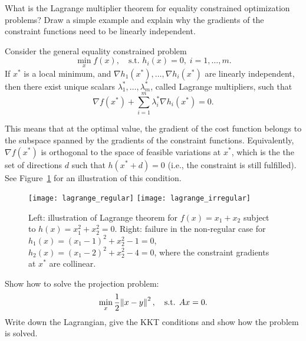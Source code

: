 \documentclass{article}
\begin{document}
\begin{question}
  What is the Lagrange multiplier theorem for equality constrained optimization problems? Draw a
  simple example and explain why the gradients of the constraint functions need to be linearly
  independent.
\end{question}

Consider the general equality constrained problem
\begin{equation*}
  \min_x f(x), \quad\text{s.t. } h_i(x) = 0, \; i = 1, \dots, m.
\end{equation*}
If \(x^*\) is a local minimum, and \(\nabla h_1(x^*), \dots, \nabla h_i(x^*)\) are linearly
independent, then there exist unique scalars \(\lambda^*_1, \dots, \lambda^*_m\), called Lagrange
multipliers, such that
\begin{equation*}
  \nabla f(x^*) + \sum_{i=1}^m \lambda^*_i \nabla h_i(x^*) = 0.
\end{equation*}

This means that at the optimal value, the gradient of the cost function belongs to the subspace
spanned by the gradients of the constraint functions.  Equivalently, \(\nabla f(x^*)\) is orthogonal
to the space of feasible variations at \(x^*\), which is the the set of directions \(d\) such that
\(h(x^* + d) = 0\) (i.e., the constraint is still fulfilled).  See Figure~\ref{fig:lagrange} for an
illustration of this condition.

\begin{figure}
  \centering
  \texttt{[image: lagrange\_regular]}
  \hspace{1em}
  \texttt{[image: lagrange\_irregular]}
  \caption{Left: illustration of Lagrange theorem for \(f(x) = x_1 + x_2\) subject to
    \(h(x) = x_1^2 + x_2^2 = 0\).  Right: failure in the non-regular case for
    \(h_1(x) = (x_1 - 1)^2 + x_2^2 - 1 = 0\), \(h_2(x) = (x_1 - 2)^2 + x_2^2 - 4 = 0\), where the
    constraint gradients at \(x^*\) are collinear.\label{fig:lagrange}}
\end{figure}


\begin{question}
  Show how to solve the projection problem:
  \begin{equation*}
    \min_x \frac{1}{2} \enVert{x - y}^2, \quad\text{s.t. } Ax = 0.
  \end{equation*}
  Write down the Lagrangian, give the KKT conditions and show how the problem is solved.
\end{question}
\end{document}
